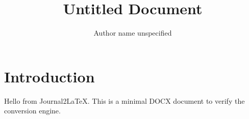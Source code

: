 \documentclass{default}
\begin{document}
\journalheader

\title{Untitled Document}
\author{Author name unspecified}
\date{}
\maketitle

\begin{abstract}

\end{abstract}

\section{Introduction}

Hello from Journal2LaTeX. This is a minimal DOCX document to verify the conversion engine.
\end{document}
